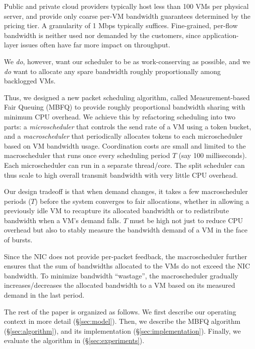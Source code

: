  Public and private
cloud providers typically host less than 100 VMs per physical server, and
provide only coarse per-VM bandwidth guarantees determined by the pricing tier.
A granularity of 1 Mbps typically suffices.  Fine-grained, per-flow bandwidth is
neither used nor demanded by the customers, since application-layer issues often
have far more impact on throughput.

We {\em do}, however, want our scheduler to be as work-conserving as possible,
and we {\em do} want to allocate any spare bandwidth roughly proportionally
among backlogged VMs.

Thus, we designed a new packet scheduling algorithm, called Measurement-based
Fair Queuing (MBFQ) to provide roughly proportional bandwidth sharing with
minimum CPU overhead. We achieve this by refactoring scheduling into two parts:
a {\em microscheduler} that controls the send rate of a VM using a token bucket,
and a {\em macroscheduler} that periodically allocates tokens to each
microscheduler based on VM bandwidth usage.  Coordination costs are small and
limited to the macroscheduler that runs once every scheduling period $T$ (say
100 milliseconds). Each microscheduler can run in a separate thread/core. The
split scheduler can thus scale to high overall transmit bandwidth with very
little CPU overhead.

Our design tradeoff is that when demand changes, it takes a few macroscheduler
periods ($T$) before the system converges to fair allocations, whether in
allowing a previously idle VM to recapture its allocated bandwidth or to
redistribute bandwidth when a VM's demand falls.  $T$  must be high not just to
reduce CPU overhead but also to stably measure the bandwidth demand of a VM in
the face of bursts.

Since the NIC does not provide per-packet feedback, the macroscheduler further
ensures that the sum of bandwidths allocated to the VMs do not exceed the NIC
bandwidth. To minimize bandwidth ``wastage'', the macroscheduler gradually
increases/decreases the allocated bandwidth to a VM based on its measured demand
in the last period. 

The rest of the paper is organized as follows. We first describe our operating
context in more detail (\S\ref{sec:model}). Then, we describe the MBFQ algorithm
(\S\ref{sec:algorithm}), and its implementation (\S\ref{sec:implementation}).
Finally, we evaluate the algorithm in (\S\ref{sec:experiments}). 

